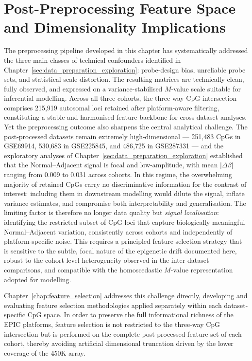\section{Post-Preprocessing Feature Space and Dimensionality Implications}
\label{sec:postproc_rationale}

The preprocessing pipeline developed in this chapter has systematically
addressed the three main classes of technical confounders identified in
Chapter~\ref{sec:data_preparation_exploration}: probe-design bias,
unreliable probe sets, and statistical scale distortion. The resulting
matrices are technically clean, fully observed, and expressed on a
variance-stabilised $M$-value scale suitable for inferential modelling.
Across all three cohorts, the three-way CpG intersection comprises
215{,}919 autosomal loci retained after platform-aware filtering,
constituting a stable and harmonised feature backbone for cross-dataset
analyses.
Yet the preprocessing outcome also sharpens the central analytical
challenge. The post-processed datasets remain extremely high-dimensional
--- 251{,}483 CpGs in GSE69914, 530{,}683 in GSE225845, and 486{,}725
in GSE287331 --- and the exploratory analyses of
Chapter~\ref{sec:data_preparation_exploration} established that the
Normal--Adjacent signal is focal and low-amplitude, with mean
$|\Delta\beta|$ ranging from 0.009 to 0.031 across cohorts. In this
regime, the overwhelming majority of retained CpGs carry no
discriminative information for the contrast of interest: including them
in downstream modelling would dilute the signal, inflate variance
estimates, and compromise both interpretability and generalisation.
The limiting factor is therefore no longer data quality but
\emph{signal localisation}: identifying the restricted subset of CpG
loci that capture biologically meaningful Normal--Adjacent variation,
consistently across cohorts and independently of platform-specific
noise. This requires a principled feature selection strategy that is
sensitive to the subtle, focal nature of the epigenetic drift documented
here, robust to the cohort-level heterogeneity observed in the
inter-dataset comparisons, and compatible with the homoscedastic
$M$-value representation adopted for modelling.

Chapter~\ref{chap:feature_selection} addresses this challenge directly,
developing and evaluating feature selection methodologies applied
separately within each dataset-specific CpG space. In order to preserve
the full informational richness of the EPIC platforms, feature selection
is not restricted to the three-way CpG intersection but is performed on
the complete post-processed feature set of each cohort, thereby avoiding
artificial dimensional truncation driven by the lower coverage of the
450K array.
